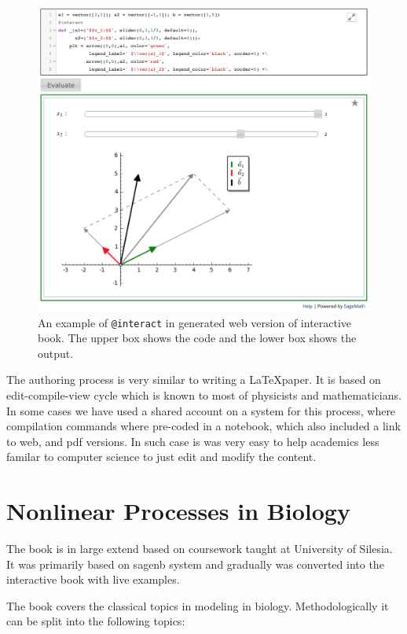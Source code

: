 \documentclass{deliverablereport}
\begin{document}
\begin{figure}
\centerline{\includegraphics[width=.7\textwidth]{interact_in_sphinx.png}}
\caption{\label{fig:interact_sphinx} An example of \texttt{@interact} in
  \Sphinx generated web version of interactive book. The upper box
  shows the code and the lower box shows the output.}
\end{figure}


The authoring process is very similar to writing a \LaTeX paper. It
is based on edit-compile-view cycle which is known to most of
physicists and mathematicians. In some cases we have used a shared
account on a \Jupyter system for this process, where compilation commands
where pre-coded in a \Jupyter notebook, which also included a link to
web, and pdf versions. In such case is was very easy to help
academics less familar to computer science to just edit and modify the
content.


\section{ Nonlinear Processes in Biology }


The book is in large extend based on coursework taught at University
of Silesia. It was primarily based on sagenb system and gradually was
converted into the interactive book with live examples.


The book covers the classical topics in modeling in
biology. Methodologically it can be split into the following topics:
\end{document}
